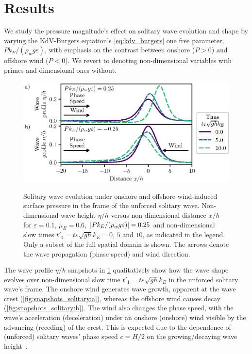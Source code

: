 \documentclass{jfm}
\renewcommand*{\epsilon}{\varepsilon}
\begin{document}
\section{\label{sec:results} Results}
We study the pressure magnitude's effect on solitary
wave evolution and shape by varying the KdV-Burgers equation's
\cref{eq:kdv_burgers} one free parameter, $P k_E/(\rho_w g \epsilon)$,
with emphasis on the contrast between onshore ($P > 0$) and offshore
wind ($P < 0$).
We revert to denoting non-dimensional variables with primes and
dimensional ones without.

\begin{figure}
  \centering
  { %
    \label{fig:snapshots_solitary:a}
    \label{fig:snapshots_solitary:b}
  }
  \includegraphics{Snapshots-Positive-Negative-Production.eps}
  \caption{
    Solitary wave evolution under
    onshore and
    offshore wind-induced surface pressure in the frame of the unforced
    solitary wave.
    Non-dimensional wave height $\eta/h$ versus
    non-dimensional distance $x/h$ for $\epsilon=0.1$,
    $\mu_E = 0.6$, $\abs{P k_E/(\rho_w g \epsilon)} = 0.25$ and
    non-dimensional slow times $t'_1 = t \epsilon \sqrt{gh} k_E = 0$,
    $5$ and $10$, as indicated in the legend.
    Only a subset of the full spatial domain is shown.
    The arrows denote the wave propagation (phase speed) and wind
    direction.
  }\label{fig:snapshots_solitary}
\end{figure}

The wave profile $\eta/h$ snapshots in \cref{fig:snapshots_solitary}
qualitatively show how the wave shape evolves over non-dimensional slow
time $t'_1 = t \epsilon \sqrt{g h} k_E$ in the unforced solitary wave's
frame.
The onshore wind generates wave growth, apparent at the wave
crest (\cref{fig:snapshots_solitary:a}), whereas the offshore wind causes
decay (\cref{fig:snapshots_solitary:b}).
The wind also changes the phase speed, with the wave's acceleration
(deceleration) under an onshore (onshore) wind visible by the advancing
(receding) of the crest.
This is expected due to the dependence of (unforced) solitary waves' phase
speed $c = H/2$ on the growing/decaying wave
height~\cite[\eg][]{mei2005nonlinear}.
\end{document}
